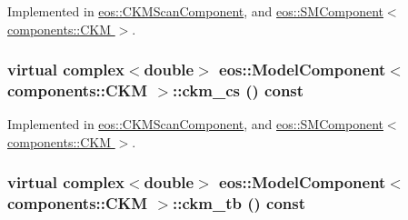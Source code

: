 Implemented in \hyperlink{classeos_1_1CKMScanComponent_afcdd4f857807dcb95aa252f45cbc9e41}{eos::CKMScanComponent}, and \hyperlink{classeos_1_1SMComponent_3_01components_1_1CKM_01_4_a9ed875717a5f63d01efb163f951f5149}{eos::SMComponent$<$ components::CKM $>$}.\hypertarget{classeos_1_1ModelComponent_3_01components_1_1CKM_01_4_a9d537c64b4c3379d4a7ebd8ccc815a7e}{
\subsubsection[{ckm\_\-cs}]{\setlength{\rightskip}{0pt plus 5cm}virtual complex$<$double$>$ eos::ModelComponent$<$ components::CKM $>$::ckm\_\-cs () const}}
\label{classeos_1_1ModelComponent_3_01components_1_1CKM_01_4_a9d537c64b4c3379d4a7ebd8ccc815a7e}


Implemented in \hyperlink{classeos_1_1CKMScanComponent_adb49ab08f60bdd5de0fccb3748cacf03}{eos::CKMScanComponent}, and \hyperlink{classeos_1_1SMComponent_3_01components_1_1CKM_01_4_a6bea3d64797260948d80302c11b5a6c1}{eos::SMComponent$<$ components::CKM $>$}.\hypertarget{classeos_1_1ModelComponent_3_01components_1_1CKM_01_4_a047bf55d51bf31e6b3a00777e7986613}{
\subsubsection[{ckm\_\-tb}]{\setlength{\rightskip}{0pt plus 5cm}virtual complex$<$double$>$ eos::ModelComponent$<$ components::CKM $>$::ckm\_\-tb () const}}
\label{classeos_1_1ModelComponent_3_01components_1_1CKM_01_4_a047bf55d51bf31e6b3a00777e7986613}


